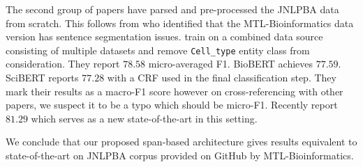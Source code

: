 The second group of papers have parsed and pre-processed the JNLPBA data from scratch. This follows from \cite{yoon2019collabonet} who identified that the MTL-Bioinformatics data version has sentence segmentation issues. \cite{yoon2019collabonet} train on a combined data source consisting of multiple datasets and remove \texttt{Cell\_type} entity class from consideration. They report $78.58$ micro-averaged F1. BioBERT\cite{lee2020biobert} achieves $77.59$. SciBERT\cite{beltagy2019scibert} reports $77.28$ with a CRF used in the final classification step. They mark their results as a macro-F1 score however on cross-referencing with other papers, we suspect it to be a typo which should be micro-F1. Recently \cite{kocaman2021spark} report $81.29$ which serves as a new state-of-the-art in this setting.

We conclude that our proposed span-based architecture gives results equivalent to state-of-the-art on JNLPBA corpus provided on GitHub by MTL-Bioinformatics\cite{crichton2017neural}.
